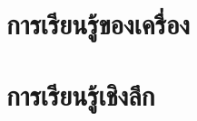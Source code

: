 \clearpage


%
%

\tableofcontents
\clearpage

\listoffigures
\clearpage

\listoftables
\clearpage

\lstlistoflistings
\clearpage


\setmainpagenumbering
\mainmatter

\part{การเรียนรู้ของเครื่อง}













\part{การเรียนรู้เชิงลึก}

